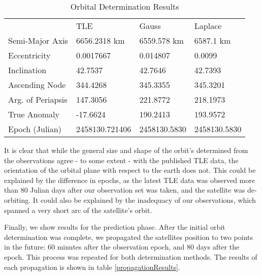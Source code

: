 \documentclass[11pt,twoside,letterpaper]{article}
\begin{document}
  \begin{table}
    \centering
    \begin{tabular}{llll}
      & TLE & Gauss & Laplace \\ \cline{2-4} 
      \multicolumn{1}{l|}{Semi-Major Axis} & \multicolumn{1}{l|}{6656.2318 km} & \multicolumn{1}{l|}{6559.578 km} & \multicolumn{1}{l|}{6587.1 km} \\ \cline{2-4} 
      \multicolumn{1}{l|}{Eccentricity} & \multicolumn{1}{l|}{0.0017667} & \multicolumn{1}{l|}{0.014807} & \multicolumn{1}{l|}{0.0099} \\ \cline{2-4} 
      \multicolumn{1}{l|}{Inclination} & \multicolumn{1}{l|}{42.7537} & \multicolumn{1}{l|}{42.7646} & \multicolumn{1}{l|}{42.7393} \\ \cline{2-4} 
      \multicolumn{1}{l|}{Ascending Node} & \multicolumn{1}{l|}{344.4268} & \multicolumn{1}{l|}{345.3355} & \multicolumn{1}{l|}{345.3201} \\ \cline{2-4} 
      \multicolumn{1}{l|}{Arg. of Periapsis} & \multicolumn{1}{l|}{147.3056} & \multicolumn{1}{l|}{221.8772} & \multicolumn{1}{l|}{218.1973} \\ \cline{2-4} 
      \multicolumn{1}{l|}{True Anomaly} & \multicolumn{1}{l|}{-17.6624} & \multicolumn{1}{l|}{190.2413} & \multicolumn{1}{l|}{193.9572} \\ \cline{2-4} 
      \multicolumn{1}{l|}{Epoch (Julian)} & \multicolumn{1}{l|}{2458130.721406} & \multicolumn{1}{l|}{2458130.5830} & \multicolumn{1}{l|}{2458130.5830} \\ \cline{2-4} 
    \end{tabular}
    \caption{Orbital Determination Results}
    \label{resultsTable}
  \end{table}

  It is clear that while the general size and shape of the orbit's
  determined from the observations agree - to some extent - with the
  published TLE data, the orientation of the orbital plane with
  respect to the earth does not. This could be explained by the
  difference in epochs, as the latest TLE data was observed more than
  80 Julian days after our observation set was taken, and the
  satellite was de-orbiting. It could also be explained by the
  inadequacy of our observations, which spanned a very short arc of
  the satellite's orbit.

  Finally, we show results for the prediction phase. After the initial
  orbit determination was complete, we propagated the satellites
  position to two points in the future: 60 minutes after the
  observation epoch, and 80 days after the epoch. This process was
  repeated for both determination methods. The results of each
  propagation is shown in table \ref{propagationResults}.
\end{document}
